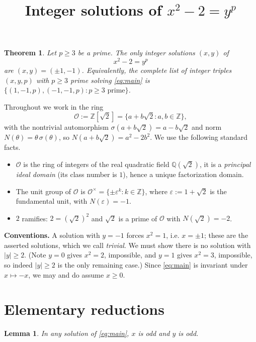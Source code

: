 \documentclass{amsart}
\newtheorem{theorem}{Theorem}
\newtheorem{lemma}{Lemma}
\theoremstyle{definition}
\begin{document}
\title{Integer solutions of $x^2-2=y^p$}
\maketitle

\begin{theorem}\label{thm:main}
Let $p\ge 3$ be a prime. The only integer solutions $(x,y)$ of
\begin{equation}\label{eq:main}
x^2-2=y^p
\end{equation}
are $(x,y)=(\pm 1,-1)$. Equivalently, the complete list of integer triples
$(x,y,p)$ with $p\ge 3$ prime solving \eqref{eq:main} is
$\{(1,-1,p),(-1,-1,p): p\ge 3 \text{ prime}\}$.
\end{theorem}

Throughout we work in the ring
\[
\mathcal O:=\mathbb Z[\sqrt2]=\{a+b\sqrt2:a,b\in\mathbb Z\},
\]
with the nontrivial automorphism $\sigma(a+b\sqrt2)=a-b\sqrt2$ and norm
$N(\theta)=\theta\,\sigma(\theta)$, so $N(a+b\sqrt2)=a^2-2b^2$. We use the
following standard facts.

\begin{itemize}
\item $\mathcal O$ is the ring of integers of the real quadratic field
$\mathbb Q(\sqrt2)$, it is a \emph{principal ideal domain} (its class number is
$1$), hence a unique factorization domain.
\item The unit group of $\mathcal O$ is
$\mathcal O^\times=\{\pm\varepsilon^{k}:k\in\mathbb Z\}$, where
$\varepsilon:=1+\sqrt2$ is the fundamental unit, with $N(\varepsilon)=-1$.
\item $2$ ramifies: $2=(\sqrt2)^2$ and $\sqrt2$ is a prime of $\mathcal O$ with
$N(\sqrt2)=-2$.
\end{itemize}

\medskip
\noindent\textbf{Conventions.} A solution with $y=-1$ forces $x^2=1$, i.e.
$x=\pm1$; these are the asserted solutions, which we call \emph{trivial}.
We must show there is no solution with $|y|\ge 2$. (Note $y=0$ gives $x^2=2$,
impossible, and $y=1$ gives $x^2=3$, impossible, so indeed $|y|\ge 2$ is the
only remaining case.) Since \eqref{eq:main} is invariant under $x\mapsto -x$, we
may and do assume $x\ge 0$.

\section{Elementary reductions}

\begin{lemma}\label{lem:parity}
In any solution of \eqref{eq:main}, $x$ is odd and $y$ is odd.
\end{lemma}
\end{document}
